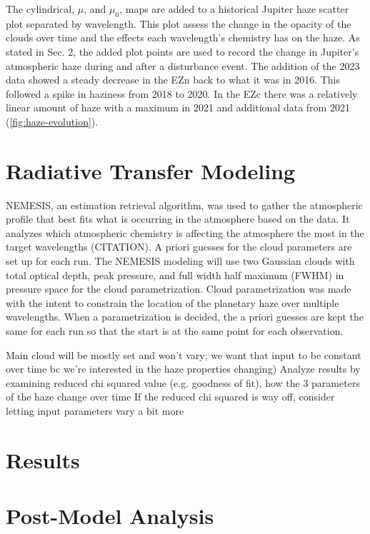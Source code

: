 \documentclass[a4paper,fleqn]{cas-dc}
\begin{document}
The cylindrical, $\mu$, and $\mu_0$, maps are added to a historical Jupiter haze scatter plot separated by wavelength. This plot assess the change in the opacity of the clouds over time and the effects each wavelength's chemistry has on the haze. As stated in Sec. 2, the added plot points are used to record the change in Jupiter’s atmospheric haze during and after a disturbance event. The addition of the 2023 data showed a steady decrease in the EZn back to what it was in 2016. This followed a spike in haziness from 2018 to 2020. In the EZc there was a relatively linear amount of haze with a maximum in 2021 and additional data from 2021 (\ref{fig:haze-evolution}).

\section{Radiative Transfer Modeling}
NEMESIS, an estimation retrieval algorithm, was used to gather the atmospheric profile that best fits what is occurring in the atmosphere based on the data. It analyzes which atmospheric chemistry is affecting the atmosphere the most in the target wavelengths (CITATION). A priori guesses for the cloud parameters are set up for each run. The NEMESIS modeling will use two Gaussian clouds with total optical depth, peak pressure, and full width half maximum (FWHM) in pressure space for the cloud parametrization. Cloud parametrization was made with the intent to constrain the location of the planetary haze over multiple wavelengths. When a parametrization is decided, the a priori guesses are kept the same for each run so that the start is at the same point for each observation.



Main cloud will be mostly set and won’t vary; we want that input to be constant over time bc we’re interested in the haze properties changing)
Analyze results by examining reduced chi squared value (e.g. goodness of fit), how the 3 parameters of the haze change over time
If the reduced chi squared is way off, consider letting input parameters vary a bit more

\section{Results}

\section{Post-Model Analysis}



\end{document}
